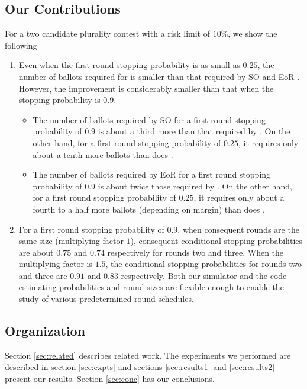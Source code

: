 \subsection{Our Contributions}
For a two candidate plurality contest with a risk limit of $10\%$, we show the following
\begin{enumerate}
\item Even when the first round stopping probability is as small as $0.25$, the number of ballots required for \Minerva is smaller than that required by SO \BRAVO and EoR \BRAVO. However, the improvement is considerably smaller than that when the stopping probability is $0.9$. 
\begin{itemize}
\item The number of ballots required by SO \BRAVO for a first round stopping probability of $0.9$ is about a third more than that required by \Minerva. On the other hand, for a first round stopping probability of $0.25$, it requires only about a tenth more ballots than does \Minerva.  
\item The number of ballots required by EoR \BRAVO for a first round stopping probability of $0.9$ is about twice those required by \Minerva. On the other hand, for a first round stopping probability of $0.25$, it requires only about a fourth to a half more ballots (depending on margin) than does \Minerva.  
\end{itemize}
\item For a first round stopping probability of $0.9$, when consequent \Minerva rounds are the same size (multiplying factor $1$), consequent conditional stopping probabilities are about $0.75$ and $0.74$ respectively for rounds two and three. When the multiplying factor is $1.5$, the conditional stopping probabilities for rounds two and three are $0.91$ and $0.83$ respectively. Both our simulator and the code estimating probabilities and round sizes are flexible enough to enable the study of various predetermined round schedules. 
\end{enumerate}

\subsection{Organization} Section \ref{sec:related} describes related work. The experiments we performed are described in section \ref{sec:expts} and sections \ref{sec:results1} and \ref{sec:results2} present our results. Section \ref{sec:conc} has our conclusions. 

